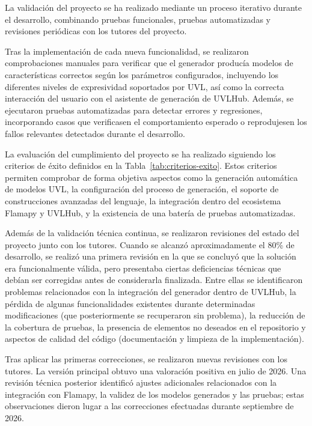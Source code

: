 La validación del proyecto se ha realizado mediante un proceso iterativo durante el desarrollo, combinando pruebas funcionales, pruebas automatizadas y revisiones periódicas con los tutores del proyecto.

Tras la implementación de cada nueva funcionalidad, se realizaron comprobaciones manuales para verificar que el generador producía modelos de características correctos según los parámetros configurados, incluyendo los diferentes niveles de expresividad soportados por UVL, así como la correcta interacción del usuario con el asistente de
generación de UVLHub. Además, se ejecutaron pruebas automatizadas para
detectar errores y regresiones, incorporando casos que verificasen el
comportamiento esperado o reprodujesen los fallos relevantes detectados
durante el desarrollo.

La evaluación del cumplimiento del proyecto se ha realizado siguiendo los criterios de éxito definidos en la Tabla~\ref{tab:criterios-exito}. Estos criterios permiten comprobar de forma objetiva aspectos como la generación automática de modelos UVL, la configuración del proceso de generación, el soporte de construcciones avanzadas del lenguaje, la integración dentro del ecosistema Flamapy y UVLHub, y la existencia de una batería de pruebas automatizadas.

Además de la validación técnica continua, se realizaron revisiones del estado del proyecto junto con los tutores. Cuando se alcanzó aproximadamente el 80\% de desarrollo, se realizó una primera revisión en la que se concluyó que la solución era funcionalmente válida, pero presentaba ciertas deficiencias técnicas que debían ser corregidas antes de considerarla finalizada. Entre ellas se identificaron problemas relacionados con la integración del generador dentro de UVLHub, la pérdida de algunas funcionalidades existentes durante determinadas modificaciones (que posteriormente se recuperaron sin problema), la reducción de la cobertura de pruebas, la presencia de elementos no deseados en el repositorio y aspectos de calidad del código (documentación y limpieza de la implementación).

Tras aplicar las primeras correcciones, se realizaron nuevas revisiones
con los tutores. La versión principal obtuvo una valoración positiva en
julio de 2026. Una revisión técnica posterior identificó ajustes
adicionales relacionados con la integración con Flamapy, la validez de
los modelos generados y las pruebas; estas observaciones dieron lugar a
las correcciones efectuadas durante septiembre de 2026.

